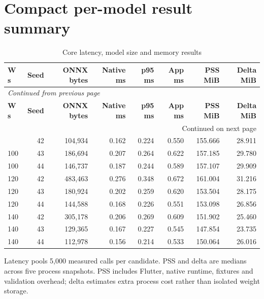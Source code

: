 \documentclass[10pt,a4paper]{article}
\begin{document}
\section{Compact per-model result summary}
\begingroup\small\setlength{\tabcolsep}{4pt}\renewcommand{\arraystretch}{1.12}
\begin{longtable}{@{}lrrrrrrr@{}}
\caption{Core latency, model size and memory results}\\
\toprule
\textbf{W s} & \textbf{Seed} & \textbf{ONNX bytes} & \textbf{Native ms} & \textbf{p95 ms} & \textbf{App ms} & \textbf{PSS MiB} & \textbf{Delta MiB} \\
\midrule\endfirsthead
\multicolumn{8}{l}{\small\itshape Continued from previous page}\\
\toprule
\textbf{W s} & \textbf{Seed} & \textbf{ONNX bytes} & \textbf{Native ms} & \textbf{p95 ms} & \textbf{App ms} & \textbf{PSS MiB} & \textbf{Delta MiB} \\
\midrule\endhead
\midrule\multicolumn{8}{r}{\small Continued on next page}\\\endfoot
\bottomrule\endlastfoot
100 & 42 & 104,934 & 0.162 & 0.224 & 0.550 & 155.666 & 28.911 \\
100 & 43 & 186,694 & 0.207 & 0.264 & 0.622 & 157.185 & 29.780 \\
100 & 44 & 146,737 & 0.187 & 0.244 & 0.589 & 157.107 & 29.909 \\
120 & 42 & 483,463 & 0.276 & 0.348 & 0.672 & 161.004 & 31.216 \\
120 & 43 & 180,924 & 0.202 & 0.259 & 0.620 & 153.504 & 28.175 \\
120 & 44 & 144,588 & 0.168 & 0.226 & 0.551 & 153.098 & 26.856 \\
140 & 42 & 305,178 & 0.206 & 0.269 & 0.609 & 151.902 & 25.460 \\
140 & 43 & 129,365 & 0.167 & 0.227 & 0.545 & 147.854 & 23.735 \\
140 & 44 & 112,978 & 0.156 & 0.214 & 0.533 & 150.064 & 26.016 \\
\end{longtable}\endgroup
\noindent\small Latency pools 5,000 measured calls per candidate. PSS and delta are medians across five process snapshots. PSS includes Flutter, native runtime, fixtures and validation overhead; delta estimates extra process cost rather than isolated weight storage.\normalsize\par\medskip
\end{document}
